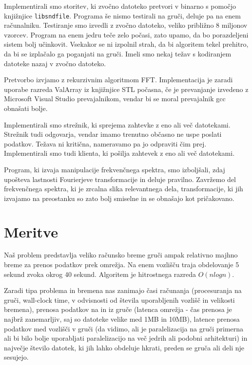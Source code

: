 \documentclass[11pt]{article}
\begin{document}
Implementirali smo storitev, ki zvočno datoteko pretvori v binarno s pomočjo knjižnjice \texttt{libsndfile}\cite{Audio}. Programa še nismo testirali na gruči, deluje pa na enem računalniku. Testiranje smo izvedli z zvočno datoteko, veliko približno 8 miljonov vzorcev. Program na enem jedru teče zelo počasi, zato upamo, da bo porazdeljeni sistem bolj učinkovit. Vsekakor se ni izpolnil strah, da bi algoritem tekel prehitro, da bi se izplačalo ga poganjati na gruči. Imeli smo nekaj težav s kodiranjem datoteke nazaj v zvočno datoteko.

Pretvorbo izvjamo z rekurzivnim algoritmom FFT. Implementacija je zaradi uporabe razreda ValArray iz knjižnjice STL počasna, če je prevanjanje izvedeno z Microsoft Visual Studio prevajalnikom, vendar bi se moral prevajalnik gcc obnašati bolje. 

\vspace{10pt}

Implementirali smo strežnik, ki sprejema zahtevke z eno ali več datotekami. Strežnik tudi odgovarja, vendar imamo trenutno občasno ne uspe poslati podatkov. Težava ni kritična, nameravamo pa jo odpraviti čim prej. Implementirali smo tudi klienta, ki pošilja zahtevek z eno ali več datotekami.

Program, ki izvaja manipulacije frekvenčnega spektra, smo izboljšali, zdaj upošteva lastnosti Fourierjeve transformacije in deluje pravilno. Zavržemo del frekvenčnega spektra, ki je zrcalna slika relevantnega dela, transformacije, ki jih izvajamo na preostanku so zato bolj smiselne in se obnašajo kot pričakovano.

\vspace{10pt}


\section{Meritve}

Naš problem predstavlja veliko računsko breme gruči ampak relativno majhno breme za prenos podatkov prek omrežja. Na enem vozlišču traja obdelovanje 5 sekund zvoka okrog 40 sekund. Algoritem je hitrostnega razreda $O(n log n)$.

Zaradi tipa problema in bremena nas zanimajo časi računanja (procesuranja na gruči, wall-clock time, v odvisnosti od števila uporabljenih vozlišč in velikosti bremena), prenosa podatkov na in iz gruče (latenca omrežja - čas prenosa je najbrž zanemarljiv, saj so datoteke velike med 1MB in 10MB), latence prenosa podatkov med vozlišči v gruči (da vidimo, ali je paralelizacija na gruči primerna ali bi bilo bolje uporabljati paralelizacijo na več jedrih ali podobni arhitekturi) in največje število datotek, ki jih lahko obdeluje hkrati, preden se gruča ali deli nje sesujejo.
\end{document}
